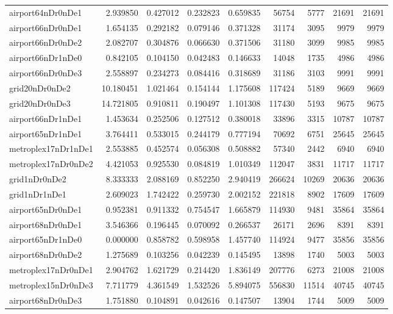\begin{longtable}{|l|r|r|r|r|r|r|r|r|}
airport64nDr0nDe1 & 2.939850 & 0.427012 & 0.232823 & 0.659835 & 56754 & 5777 & 21691 & 21691 \\
airport66nDr0nDe1 & 1.654135 & 0.292182 & 0.079146 & 0.371328 & 31174 & 3095 & 9979 & 9979 \\
airport66nDr0nDe2 & 2.082707 & 0.304876 & 0.066630 & 0.371506 & 31180 & 3099 & 9985 & 9985 \\
airport66nDr1nDe0 & 0.842105 & 0.104150 & 0.042483 & 0.146633 & 14048 & 1735 & 4986 & 4986 \\
airport66nDr0nDe3 & 2.558897 & 0.234273 & 0.084416 & 0.318689 & 31186 & 3103 & 9991 & 9991 \\
grid20nDr0nDe2 & 10.180451 & 1.021464 & 0.154144 & 1.175608 & 117424 & 5189 & 9669 & 9669 \\
grid20nDr0nDe3 & 14.721805 & 0.910811 & 0.190497 & 1.101308 & 117430 & 5193 & 9675 & 9675 \\
airport66nDr1nDe1 & 1.453634 & 0.252506 & 0.127512 & 0.380018 & 33896 & 3315 & 10787 & 10787 \\
airport65nDr1nDe1 & 3.764411 & 0.533015 & 0.244179 & 0.777194 & 70692 & 6751 & 25645 & 25645 \\
metroplex17nDr1nDe1 & 2.553885 & 0.452574 & 0.056308 & 0.508882 & 57340 & 2442 & 6940 & 6940 \\
metroplex17nDr0nDe2 & 4.421053 & 0.925530 & 0.084819 & 1.010349 & 112047 & 3831 & 11717 & 11717 \\
grid1nDr0nDe2 & 8.333333 & 2.088169 & 0.852250 & 2.940419 & 266624 & 10269 & 20636 & 20636 \\
grid1nDr1nDe1 & 2.609023 & 1.742422 & 0.259730 & 2.002152 & 221818 & 8902 & 17609 & 17609 \\
airport65nDr0nDe1 & 0.952381 & 0.911332 & 0.754547 & 1.665879 & 114930 & 9481 & 35864 & 35864 \\
airport68nDr0nDe1 & 3.546366 & 0.196445 & 0.070092 & 0.266537 & 26171 & 2696 & 8391 & 8391 \\
airport65nDr1nDe0 & 0.000000 & 0.858782 & 0.598958 & 1.457740 & 114924 & 9477 & 35856 & 35856 \\
airport68nDr0nDe2 & 1.275689 & 0.103256 & 0.042239 & 0.145495 & 13898 & 1740 & 5003 & 5003 \\
metroplex17nDr0nDe1 & 2.904762 & 1.621729 & 0.214420 & 1.836149 & 207776 & 6273 & 21008 & 21008 \\
metroplex15nDr0nDe3 & 7.711779 & 4.361549 & 1.532526 & 5.894075 & 556830 & 11514 & 40745 & 40745 \\
airport68nDr0nDe3 & 1.751880 & 0.104891 & 0.042616 & 0.147507 & 13904 & 1744 & 5009 & 5009 \\

\end{longtable}

